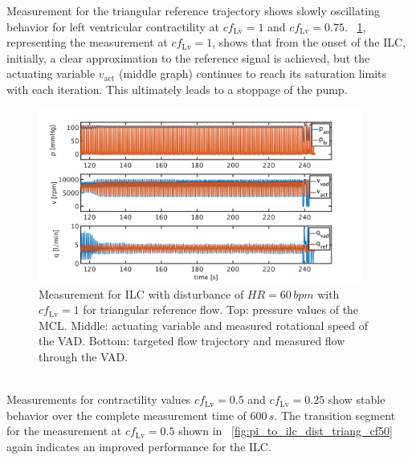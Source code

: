 Measurement for the triangular reference trajectory shows slowly oscillating behavior for left ventricular contractility at $cf_{\mathrm{Lv}}=1$ and $cf_{\mathrm{Lv}}=0.75$. \figurename~\ref{fig:pi_to_ilc_dist_triang_cf1}, representing the measurement at $cf_{\mathrm{Lv}}=1$, shows that from the onset of the ILC, initially, a clear approximation to the reference signal is achieved, but the actuating variable $v_{\mathrm{act}}$ (middle graph) continues to reach its saturation limits with each iteration. This ultimately leads to a stoppage of the pump.
\begin{figure}[ht!]
  \centering
  \includegraphics[width=0.95\textwidth]{images/chapt_5/ILC/pi_to_ilc_dist_triang_cf1.pdf}
  \caption[Measurement for ILC with disturbance of $HR=60\,bpm$ with $cf_{\mathrm{Lv}}=1$ for triangular reference flow]{Measurement for ILC with disturbance of $HR=60\,bpm$ with $cf_{\mathrm{Lv}}=1$ for triangular reference flow. Top:  pressure values of the MCL. Middle: actuating variable and measured rotational speed of the VAD. Bottom: targeted flow trajectory and measured flow through the VAD.}
  \label{fig:pi_to_ilc_dist_triang_cf1}
\end{figure}
\\Measurements for contractility values $cf_{\mathrm{Lv}}=0.5$ and $cf_{\mathrm{Lv}}=0.25$ show stable behavior over the complete measurement time of $600\,s$. The transition segment for the measurement at $cf_{\mathrm{Lv}}=0.5$ shown in \figurename~\ref{fig:pi_to_ilc_dist_triang_cf50} again indicates an improved performance for the ILC.
